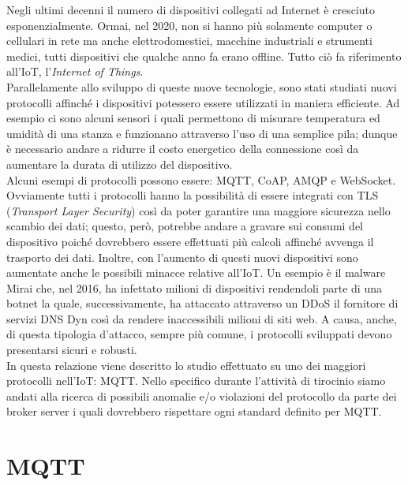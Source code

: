 \documentclass[Lau,binding=0.6cm,noexaminfo=true]{sapthesis}
\begin{document}
\begin{large}
Negli ultimi decenni il numero di dispositivi collegati ad Internet è cresciuto esponenzialmente. Ormai, nel 2020, non si hanno più solamente computer o cellulari in rete ma anche elettrodomestici, macchine industriali e strumenti medici, tutti dispositivi che qualche anno fa erano offline. Tutto ciò fa riferimento all'IoT, l'\textit{Internet of Things}. \\
Parallelamente allo sviluppo di queste nuove tecnologie, sono stati studiati nuovi protocolli affinché i dispositivi potessero essere utilizzati in maniera efficiente. Ad esempio ci sono alcuni sensori i quali permettono di misurare temperatura ed umidità di una stanza e funzionano attraverso l'uso di una semplice pila; dunque è necessario andare a ridurre il costo energetico della connessione così da aumentare la durata di utilizzo del dispositivo. \\
Alcuni esempi di protocolli possono essere: MQTT, CoAP, AMQP e WebSocket. Ovviamente tutti i protocolli hanno la possibilità di essere integrati con TLS (\textit{Transport Layer Security}) così da poter garantire una maggiore sicurezza nello scambio dei dati; questo, però, potrebbe andare a gravare sui consumi del dispositivo poiché dovrebbero essere effettuati più calcoli affinché avvenga il trasporto dei dati. Inoltre, con l'aumento di questi nuovi dispositivi sono aumentate anche le possibili minacce relative all'IoT. Un esempio è il malware Mirai \cite{wiki:Mirai} che, nel 2016, ha infettato milioni di dispositivi rendendoli parte di una botnet la quale, successivamente, ha attaccato attraverso un DDoS il fornitore di servizi DNS Dyn così da rendere inaccessibili milioni di siti web. A causa, anche, di questa tipologia d'attacco, sempre più comune, i protocolli sviluppati devono presentarsi sicuri e robusti.\\

In questa relazione viene descritto lo studio effettuato su uno dei maggiori protocolli nell'IoT: MQTT. Nello specifico durante l'attività di tirocinio siamo andati alla ricerca di possibili anomalie e/o violazioni del protocollo da parte dei broker server i quali dovrebbero rispettare ogni standard definito per MQTT.

\end{large}


\chapter{MQTT}
\end{document}
